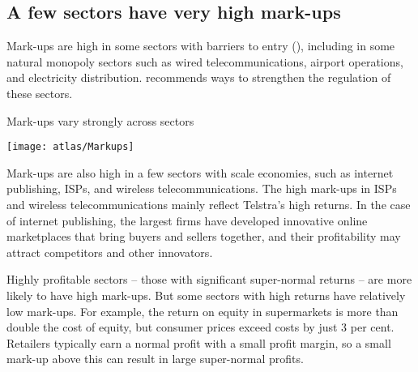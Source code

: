 \subsection{A few sectors have very high mark-ups}

Mark-ups are high in some sectors with barriers to entry (), including in some natural monopoly sectors such as wired telecommunications, airport operations, and electricity distribution.  recommends ways to strengthen the regulation of these sectors.

\begin{figureTop}
  \caption{Mark-ups vary strongly across sectors \label{fig:SNP-pc-of-rev-ind}}
    \texttt{[image: atlas/Markups]}
\end{figureTop}

Mark-ups are also high in a few sectors with scale economies, such as internet publishing, ISPs, and wireless telecommunications. 
The high mark-ups in ISPs and wireless telecommunications mainly reflect Telstra's high returns. 
In the case of internet publishing, the largest firms have developed innovative online marketplaces that bring buyers and sellers together, and their profitability may attract competitors and other innovators.

Highly profitable sectors -- those with significant super-normal returns -- are more likely to have high mark-ups.
But some sectors with high returns have relatively low mark-ups.
For example, the return on equity in supermarkets is more than double the cost of equity, but consumer prices exceed costs by just 3 per cent.
Retailers typically earn a normal profit with a small profit margin, so a small mark-up above this can result in large super-normal profits.



